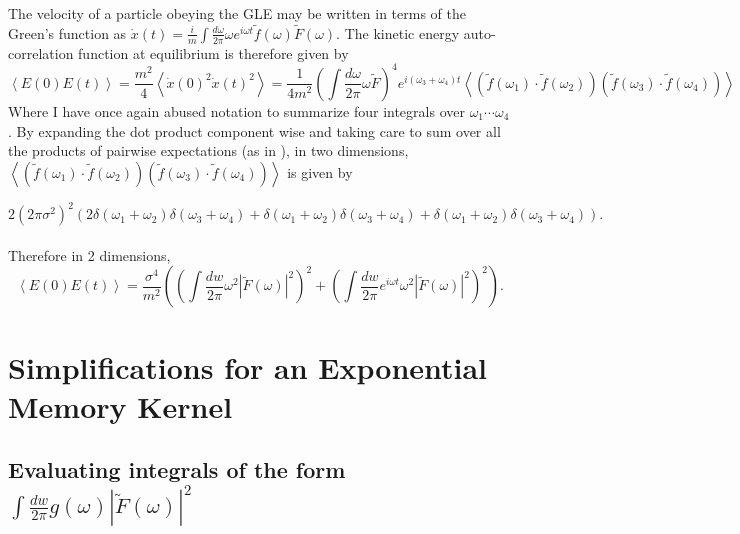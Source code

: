 The velocity of a particle obeying the GLE may be written in terms of the Green's function as $\dot{x}(t) = \frac{i}{m}\int\frac{d\omega}{2\pi} \omega e^{i\omega t}\tilde{f}(\omega)\tilde{F}(\omega)$. The kinetic energy auto-correlation function at equilibrium is therefore given by
$$
\left<E(0)E(t)\right>=\frac{m^2}{4}\left<\dot{x}(0)^2\dot{x}(t)^2\right>=\frac{1}{4m^2}\left(\int\frac{d\omega}{2\pi}\omega\tilde{F}\right)^4 e^{i\left(\omega_3 + \omega_4 \right)t} \left<\left(\tilde{f}(\omega_1)\cdot\tilde{f}(\omega_2)\right)\left(\tilde{f}(\omega_3)\cdot\tilde{f}(\omega_4)\right)\right>
$$
Where I have once again abused notation to summarize four integrals over $\omega_1\cdots\omega_4$. By expanding the dot product component wise and taking care to sum over all the products of pairwise expectations (as in \cite{Tong}), in two dimensions,  $\left<\left(\tilde{f}(\omega_1)\cdot\tilde{f}(\omega_2)\right)\left(\tilde{f}(\omega_3)\cdot\tilde{f}(\omega_4)\right)\right>$ is given by 

$$
2\left(2\pi\sigma^2\right)^2\left(2\delta(\omega_1+\omega_2)\delta(\omega_3+\omega_4) + \delta(\omega_1+\omega_2)\delta(\omega_3+\omega_4) + \delta(\omega_1+\omega_2)\delta(\omega_3+\omega_4)\right).
$$
\\
Therefore in 2 dimensions,
$$
\left<E(0)E(t)\right>=\frac{\sigma^4}{m^2}\left(\left(\int\frac{dw}{2\pi}\omega^2\left|\tilde{F}(\omega)\right|^2\right)^2 + \left(\int\frac{dw}{2\pi}e^{i\omega t}\omega^2\left|\tilde{F}(\omega)\right|^2\right)^2\right).
$$

\section{Simplifications for an Exponential Memory Kernel}

\subsection{Evaluating integrals of the form $\int\frac{dw}{2\pi} g\left(\omega\right) \left|\tilde{F}\left(\omega\right)\right|^2$} 

